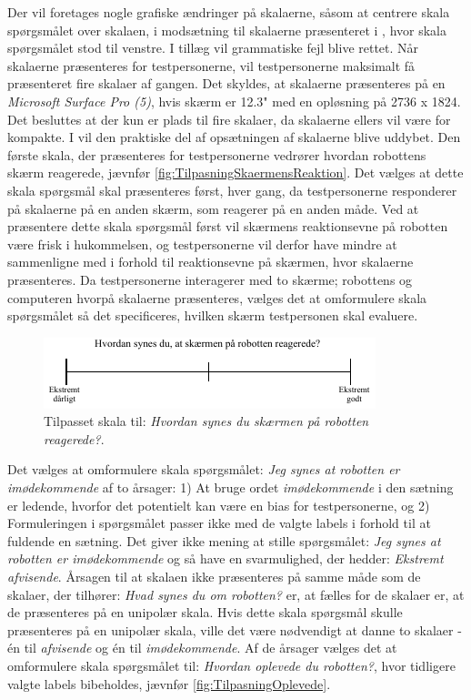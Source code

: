 Der vil foretages nogle grafiske ændringer på skalaerne, såsom at centrere skala spørgsmålet over skalaen, i modsætning til skalaerne præsenteret i , hvor skala spørgsmålet stod til venstre. I tillæg vil grammatiske fejl blive rettet. Når skalaerne præsenteres for testpersonerne, vil testpersonerne maksimalt få præsenteret fire skalaer af gangen. Det skyldes, at skalaerne præsenteres på en \textit{Microsoft Surface Pro (5)}, hvis skærm er 12.3" med en opløsning på 2736 x 1824. Det besluttes at der kun er plads til fire skalaer, da skalaerne ellers vil være for kompakte. I  vil den praktiske del af opsætningen af skalaerne blive uddybet. \blankline 
%
Den første skala, der præsenteres for testpersonerne vedrører hvordan robottens skærm reagerede, jævnfør \autoref{fig:TilpasningSkaermensReaktion}. Det vælges at dette skala spørgsmål skal præsenteres først, hver gang, da testpersonerne responderer på skalaerne på en anden skærm, som reagerer på en anden måde. Ved at præsentere dette skala spørgsmål først vil skærmens reaktionsevne på robotten være frisk i hukommelsen, og testpersonerne vil derfor have mindre at sammenligne med i forhold til reaktionsevne på skærmen, hvor skalaerne præsenteres. Da testpersonerne interagerer med to skærme; robottens og computeren hvorpå skalaerne præsenteres, vælges det at omformulere skala spørgsmålet så det specificeres, hvilken skærm testpersonen skal evaluere.  
%
%
\begin{figure}[H]
\centering
\includegraphics[width =\textwidth]{Figure/TilpasningAfSkalaer/TilpassetSkaermensReaktion} 
\caption{Tilpasset skala til: \textit{Hvordan synes du skærmen på robotten reagerede?}.}
\label{fig:TilpasningSkaermensReaktion}
\end{figure}
\noindent
%
Det vælges at omformulere skala spørgsmålet: \textit{Jeg synes at robotten er imødekommende} af to årsager: 1) At bruge ordet \textit{imødekommende} i den sætning er ledende, hvorfor det potentielt kan være en bias for testpersonerne, og 2) Formuleringen i spørgsmålet passer ikke med de valgte labels i forhold til at fuldende en sætning. Det giver ikke mening at stille spørgsmålet: \textit{Jeg synes at robotten er imødekommende} og så have en svarmulighed, der hedder: \textit{Ekstremt afvisende}. Årsagen til at skalaen ikke præsenteres på samme måde som de skalaer, der tilhører: \textit{Hvad synes du om robotten?} er, at fælles for de skalaer er, at de præsenteres på en unipolær skala. Hvis dette skala spørgsmål skulle præsenteres på en unipolær skala, ville det være nødvendigt at danne to skalaer - én til \textit{afvisende} og én til \textit{imødekommende}. Af de årsager vælges det at omformulere skala spørgsmålet til: \textit{Hvordan oplevede du robotten?}, hvor tidligere valgte labels bibeholdes, jævnfør \autoref{fig:TilpasningOplevede}.
